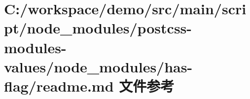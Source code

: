 \hypertarget{node__modules_2postcss-modules-values_2node__modules_2has-flag_2_r_e_a_d_m_e_8md}{}\section{C\+:/workspace/demo/src/main/script/node\+\_\+modules/postcss-\/modules-\/values/node\+\_\+modules/has-\/flag/readme.md 文件参考}
\label{node__modules_2postcss-modules-values_2node__modules_2has-flag_2_r_e_a_d_m_e_8md}
